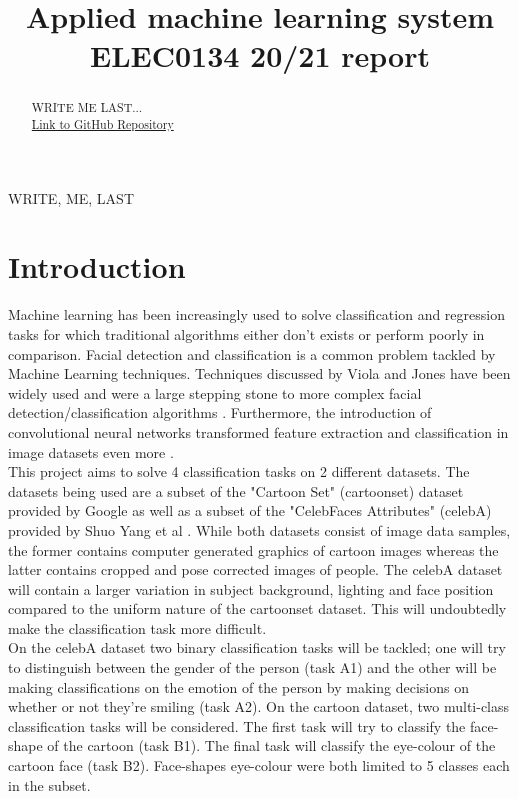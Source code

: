 \documentclass{article}
\title{Applied machine learning system ELEC0134 20/21 report}
\begin{document}
%
\maketitle
%
\begin{abstract}
    WRITE ME LAST...
    \\
    
    \href{https://github.com/tharmee99/AMLS_assignment20_21}{Link to GitHub Repository}
\end{abstract}
%
\begin{keywords}
    WRITE, ME, LAST
\end{keywords}
%

\section{Introduction}
\label{sec:introduction}
    Machine learning has been increasingly used to solve classification and regression tasks for which traditional algorithms either don't exists or perform poorly in comparison. Facial detection and classification is a common problem tackled by Machine Learning techniques. Techniques discussed by Viola and Jones \autocite{990517} have been widely used and were a large stepping stone to more complex facial detection/classification algorithms \autocite{8806572, 8549735}. Furthermore, the introduction of convolutional neural networks transformed feature extraction and classification in image datasets even more \autocite{6619290, 7553523}.
    \\
    
    This project aims to solve 4 classification tasks on 2 different datasets. The datasets being used are a subset of the "Cartoon Set" (cartoonset) dataset provided by Google \autocite{cartoonset} as well as a subset of the "CelebFaces Attributes" (celebA) provided by Shuo Yang et al \autocite{7410776}. While both datasets consist of image data samples, the former contains computer generated graphics of cartoon images whereas the latter contains cropped and pose corrected images of people. The celebA dataset will contain a larger variation in subject background, lighting and face position compared to the uniform nature of the cartoonset dataset. This will undoubtedly make the classification task more difficult.
    \\
    
    On the celebA dataset two binary classification tasks will be tackled; one will try to distinguish between the gender of the person (task A1) and the other will be making classifications on the emotion of the person by making decisions on whether or not they're smiling (task A2). On the cartoon dataset, two multi-class classification tasks will be considered. The first task will try to classify the face-shape of the cartoon (task B1). The final task will classify the eye-colour of the cartoon face (task B2). Face-shapes eye-colour were both limited to 5 classes each in the subset. 
    \\
    
\end{document}
